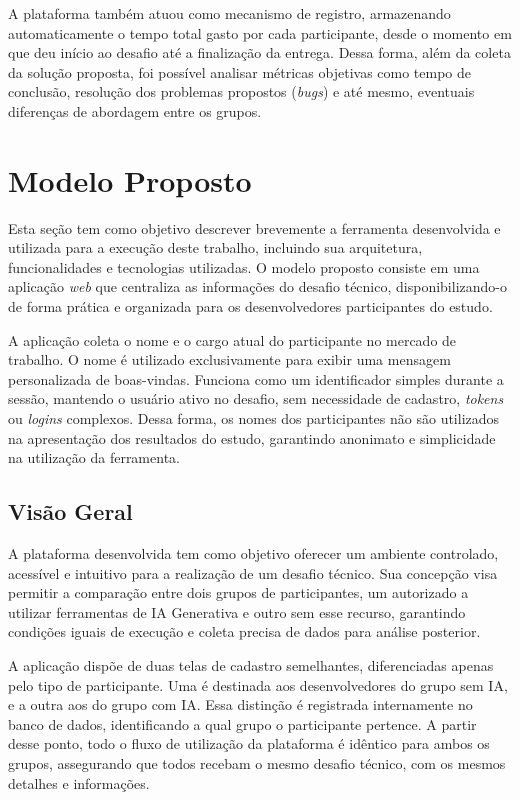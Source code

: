 \documentclass[english,brazilian]{UNISINOSartigo} %
\begin{document}
A plataforma também atuou como mecanismo de registro, armazenando automaticamente o tempo total gasto por cada participante, desde o momento em que deu início ao desafio até a finalização da entrega. Dessa forma, além da coleta da solução proposta, foi possível analisar métricas objetivas como tempo de conclusão, resolução dos problemas propostos (\textit{bugs}) e até mesmo, eventuais diferenças de abordagem entre os grupos.

\section{Modelo Proposto}

Esta seção tem como objetivo descrever brevemente a ferramenta desenvolvida e utilizada para a execução deste trabalho, incluindo sua arquitetura, funcionalidades e tecnologias utilizadas. O modelo proposto consiste em uma aplicação \textit{web} que centraliza as informações do desafio técnico, disponibilizando-o de forma prática e organizada para os desenvolvedores participantes do estudo.

A aplicação coleta o nome e o cargo atual do participante no mercado de trabalho. O nome é utilizado exclusivamente para exibir uma mensagem personalizada de boas-vindas. Funciona como um identificador simples durante a sessão, mantendo o usuário ativo no desafio, sem necessidade de cadastro, \textit{tokens} ou \textit{logins} complexos. Dessa forma, os nomes dos participantes não são utilizados na apresentação dos resultados do estudo, garantindo anonimato e simplicidade na utilização da ferramenta.

\subsection{Visão Geral}

A plataforma desenvolvida tem como objetivo oferecer um ambiente controlado, acessível e intuitivo para a realização de um desafio técnico. Sua concepção visa permitir a comparação entre dois grupos de participantes, um autorizado a utilizar ferramentas de IA Generativa e outro sem esse recurso, garantindo condições iguais de execução e coleta precisa de dados para análise posterior.

A aplicação dispõe de duas telas de cadastro semelhantes, diferenciadas apenas pelo tipo de participante. Uma é destinada aos desenvolvedores do grupo sem IA, e a outra aos do grupo com IA. Essa distinção é registrada internamente no banco de dados, identificando a qual grupo o participante pertence. A partir desse ponto, todo o fluxo de utilização da plataforma é idêntico para ambos os grupos, assegurando que todos recebam o mesmo desafio técnico, com os mesmos detalhes e informações.
\end{document}
